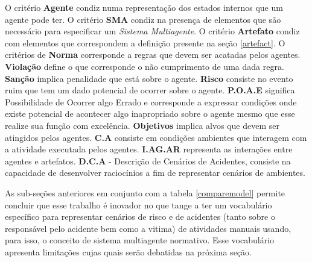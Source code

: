 O critério \textbf{Agente} condiz numa representação dos estados internos que um agente pode ter. O critério \textbf{SMA} condiz na presença de elementos que são necessário para
especificar um \textit{Sistema Multiagente}. O critério \textbf{Artefato} condiz com elementos que correspondem a definição presente na seção \ref{artefact}. O critérios de 
\textbf{Norma} corresponde a regras que devem ser acatadas pelos agentes. \textbf{Violação} define o que corresponde o não cumprimento de uma dada regra. \textbf{Sanção} implica 
penalidade que está sobre o agente. \textbf{Risco} consiste no evento ruim que tem um dado potencial de ocorrer sobre o agente. \textbf{P.O.A.E} significa Possibilidade de Ocorrer 
algo Errado e corresponde a expressar condições onde existe potencial de acontecer algo inapropriado sobre o agente mesmo que esse realize sua função com excelência.  \textbf{Objetivos} 
implica alvos que devem ser atingidos pelos agentes. \textbf{C.A} consiste em condições ambientes que interagem com a atividade executada pelos agentes. \textbf{I.AG.AR} representa 
as interações entre agentes e artefatos. \textbf{D.C.A} - Descrição de Cenários de Acidentes, consiste na capacidade de desenvolver raciocínios a fim de representar cenários de ambientes.

As sub-seções anteriores em conjunto com a tabela \ref{comparemodel} permite concluir que esse trabalho é inovador no que tange a ter um vocabulário específico para representar cenários 
de risco e de acidentes (tanto sobre o responsável pelo acidente bem como a vitima) de atividades manuais usando, para isso, o conceito de sistema multiagente normativo. Esse 
vocabulário apresenta limitações cujas quais serão debatidas na próxima seção. 
